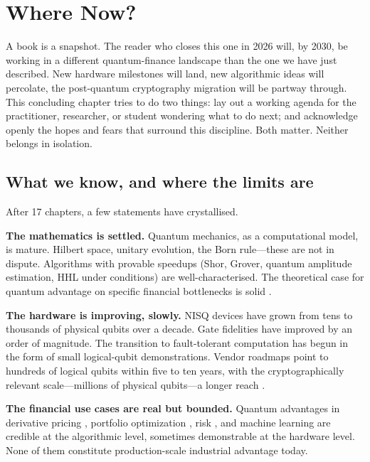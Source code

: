 \chapter{Where Now?}


A book is a snapshot. The reader who closes this one in 2026 will, by 2030, be working in a different quantum-finance landscape than the one we have just described. New hardware milestones will land, new algorithmic ideas will percolate, the post-quantum cryptography migration will be partway through. This concluding chapter tries to do two things: lay out a working agenda for the practitioner, researcher, or student wondering what to do next; and acknowledge openly the hopes and fears that surround this discipline. Both matter. Neither belongs in isolation.

\section{What we know, and where the limits are}

After 17 chapters, a few statements have crystallised.

\textbf{The mathematics is settled.} Quantum mechanics, as a computational model, is mature. Hilbert space, unitary evolution, the Born rule---these are not in dispute. Algorithms with provable speedups (Shor, Grover, quantum amplitude estimation, HHL under conditions) are well-characterised. The theoretical case for quantum advantage on specific financial bottlenecks is solid \citep{egger_quantum_2020,herman_quantum_2023,gong_quantum_2026-1}.

\textbf{The hardware is improving, slowly.} NISQ devices have grown from tens to thousands of physical qubits over a decade. Gate fidelities have improved by an order of magnitude. The transition to fault-tolerant computation has begun in the form of small logical-qubit demonstrations. Vendor roadmaps point to hundreds of logical qubits within five to ten years, with the cryptographically relevant scale---millions of physical qubits---a longer reach \citep{ibm_quantum_2023,preskill_quantum_2018}.

\textbf{The financial use cases are real but bounded.} Quantum advantages in derivative pricing \citep{stamatopoulos_option_2020,chen_quantum_2025}, portfolio optimization \citep{morapakula_end--end_2026,thomassin_quantum_2025}, risk \citep{matsakos_quantum_2024,dri_towards_2022}, and machine learning \citep{ciceri_enhanced_2025} are credible at the algorithmic level, sometimes demonstrable at the hardware level. None of them constitute production-scale industrial advantage today.

